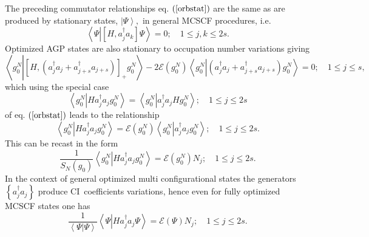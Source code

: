 \documentclass[aps,preprint]{revtex4}%
\begin{document}
The preceding commutator relationships eq. $\left(  \ref{orbstat}\right)  $
are the same as are produced by stationary states, $\left\vert \Psi
\right\rangle ,$ in general MCSCF procedures, i.e.
\begin{equation}
\left\langle \Psi\left\vert \left[  H,a_{j}^{\dagger}a_{k}\right]
\Psi\right.  \right\rangle =0;\quad1\leq j,k\leq2s.
\end{equation}
Optimized AGP states are also stationary to occupation number variations
giving
\begin{equation}
\left\langle g_{0}^{N}\left\vert \left[  H,\left(  a_{j}^{\dagger}%
a_{j}+a_{j+s}^{\dagger}a_{j+s}\right)  \right]  _{+}g_{0}^{N}\right.
\right\rangle -2\mathcal{E}\left(  g_{0}^{N}\right)  \left\langle g_{0}%
^{N}\left\vert \left(  a_{j}^{\dagger}a_{j}+a_{j+s}^{\dagger}a_{j+s}\right)
g_{0}^{N}\right.  \right\rangle =0;\quad1\leq j\leq s,
\end{equation}
which using the special case
\begin{equation}
\left\langle g_{0}^{N}\left\vert Ha_{j}^{\dagger}a_{j}g_{0}^{N}\right.
\right\rangle =\left\langle g_{0}^{N}\left\vert a_{j}^{\dagger}a_{j}Hg_{0}%
^{N}\right.  \right\rangle ;\quad1\leq j\leq2s
\end{equation}
of eq. $\left(  \ref{orbstat}\right)  $ leads to the relationship
\begin{equation}
\left\langle g_{0}^{N}\left\vert Ha_{j}^{\dagger}a_{j}g_{0}^{N}\right.
\right\rangle =\mathcal{E}\left(  g_{0}^{N}\right)  \left\langle g_{0}%
^{N}\left\vert a_{j}^{\dagger}a_{j}g_{0}^{N}\right.  \right\rangle ;\quad1\leq
j\leq2s.
\end{equation}
This can be recast in the form
\begin{equation}
\frac{1}{S_{N}\left(  g_{0}\right)  }\left\langle g_{0}^{N}\left\vert
Ha_{j}^{\dagger}a_{j}g_{0}^{N}\right.  \right\rangle =\mathcal{E}\left(
g_{0}^{N}\right)  N_{j};\quad1\leq j\leq2s.\label{occnumstat}%
\end{equation}
In the context of general optimized multi configurational states the
generators $\left\{  a_{j}^{\dagger}a_{j}\right\}  $ produce CI\ coefficients
variations, hence even for fully optimized MCSCF states one has
\begin{equation}
\frac{1}{\left\langle \left.  \Psi\right\vert \Psi\right\rangle }\left\langle
\Psi\left\vert Ha_{j}^{\dagger}a_{j}\Psi\right.  \right\rangle =\mathcal{E}%
\left(  \Psi\right)  N_{j};\quad1\leq j\leq2s.
\end{equation}
\end{document}
